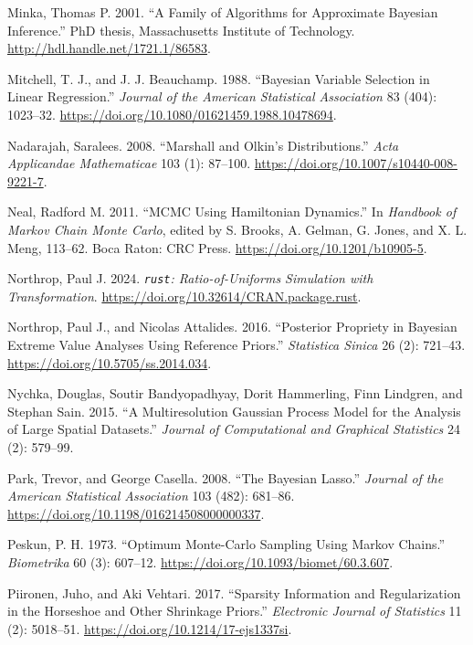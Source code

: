 \documentclass[
  11pt,
  letterpaper,
]{scrbook}
\newlength{\cslhangindent}
\newenvironment{CSLReferences}[2] %
 {\begin{list}{}{%
  \setlength{\itemindent}{0pt}
  \setlength{\leftmargin}{0pt}
  \setlength{\parsep}{0pt}
  \ifodd #1
   \setlength{\leftmargin}{\cslhangindent}
   \setlength{\itemindent}{-1\cslhangindent}
  \fi
  \setlength{\itemsep}{#2\baselineskip}}}
 {\end{list}}
\theoremstyle{plain}
\theoremstyle{plain}
\theoremstyle{plain}
\theoremstyle{definition}
\theoremstyle{definition}
\theoremstyle{definition}
\theoremstyle{remark}
\begin{document}
\begin{CSLReferences}{1}{0}
Minka, Thomas P. 2001. {``A Family of Algorithms for Approximate
{B}ayesian Inference.''} PhD thesis, Massachusetts Institute of
Technology. \url{http://hdl.handle.net/1721.1/86583}.

Mitchell, T. J., and J. J. Beauchamp. 1988. {``Bayesian Variable
Selection in Linear Regression.''} \emph{Journal of the American
Statistical Association} 83 (404): 1023--32.
\url{https://doi.org/10.1080/01621459.1988.10478694}.

Nadarajah, Saralees. 2008. {``{M}arshall and {O}lkin's Distributions.''}
\emph{Acta Applicandae Mathematicae} 103 (1): 87--100.
\url{https://doi.org/10.1007/s10440-008-9221-7}.

Neal, Radford M. 2011. {``{MCMC} Using {H}amiltonian Dynamics.''} In
\emph{Handbook of {M}arkov Chain {M}onte {C}arlo}, edited by S. Brooks,
A. Gelman, G. Jones, and X. L. Meng, 113--62. Boca Raton: CRC Press.
\url{https://doi.org/10.1201/b10905-5}.

Northrop, Paul J. 2024. \emph{\texttt{rust}: Ratio-of-Uniforms
Simulation with Transformation}.
\url{https://doi.org/10.32614/CRAN.package.rust}.

Northrop, Paul J., and Nicolas Attalides. 2016. {``Posterior Propriety
in {B}ayesian Extreme Value Analyses Using Reference Priors.''}
\emph{Statistica Sinica} 26 (2): 721--43.
\url{https://doi.org/10.5705/ss.2014.034}.

Nychka, Douglas, Soutir Bandyopadhyay, Dorit Hammerling, Finn Lindgren,
and Stephan Sain. 2015. {``A Multiresolution {G}aussian Process Model
for the Analysis of Large Spatial Datasets.''} \emph{Journal of
Computational and Graphical Statistics} 24 (2): 579--99.

Park, Trevor, and George Casella. 2008. {``The {B}ayesian {L}asso.''}
\emph{Journal of the American Statistical Association} 103 (482):
681--86. \url{https://doi.org/10.1198/016214508000000337}.

Peskun, P. H. 1973. {``Optimum {M}onte-{C}arlo Sampling Using {M}arkov
Chains.''} \emph{Biometrika} 60 (3): 607--12.
\url{https://doi.org/10.1093/biomet/60.3.607}.

Piironen, Juho, and Aki Vehtari. 2017. {``Sparsity Information and
Regularization in the Horseshoe and Other Shrinkage Priors.''}
\emph{Electronic Journal of Statistics} 11 (2): 5018--51.
\url{https://doi.org/10.1214/17-ejs1337si}.


\end{CSLReferences}
\end{document}
